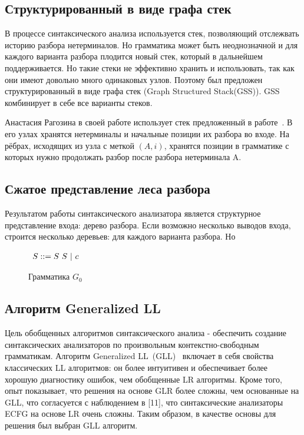 \documentclass[14pt]{matmex-diploma-custom}
\begin{document}
	\subsection{Структурированный в виде графа стек}
	В процессе синтаксического анализа используется стек, позволяющий отслежвать историю 
	разбора нетерминалов. Но грамматика может быть неоднозначной и для каждого варианта 
    разбора плодится новый стек, который в дальнейшем поддерживается.
    Но такие стеки не эффективно хранить и использовать, так как они имеют довольно много
    одинаковых узлов. Поэтому был предложен структурированный в виде графа стек
    (Graph Structured Stack(GSS)). GSS комбинирует в себе все варианты стеков.
    
    Анастасия Рагозина в своей работе использует стек предложенный в работе~\cite{afroozeh2015faster}.
    В его узлах хранятся нетерминалы и начальные позиции их разбора во входе.
    На рёбрах, исходящих из узла с меткой $(A, i)$, хранятся позиции в грамматике с которых нужно
    продолжать разбор после разбора нетерминала A.
	\subsection{Сжатое представление леса разбора}
	Результатом работы синтаксического анализатора является структурное представление
    входа: дерево разбора. Если возможно несколько выводов входа, строится несколько деревьев:
    для каждого варианта разбора. Но  
    
    \begin{figure}
        \centering
        $
        \begin{array}[b]{rl}
        S ::= S\ S\ | \ c \ \ \ 
        \end{array}
        $
        \label{fig:grammarGm0}
        \caption{Грамматика $G_0$}
        \label{fig:fig0}
    \end{figure}
	\subsection{Алгоритм Generalized LL}
	
	Цель обобщенных алгоритмов синтаксического анализа - обеспечить создание синтаксических
	анализаторов по произвольным контекстно-свободным грамматикам.
	Алгоритм Generalized LL~(GLL)~\cite{scott2010gll} включает в себя свойства классических LL алгоритмов:
	он более интуитивен и обеспечивает более хорошую диагностику ошибок, 
	чем обобщенные LR алгоритмы. Кроме того, опыт показывает, что решения на основе
	GLR более сложны, чем основанные на GLL, что согласуется с наблюдением в [11], что
	синтаксические анализаторы ECFG на основе LR очень сложны. Таким образом, в качестве
	основы для решения был выбран GLL алгоритм. 
	
\end{document}
